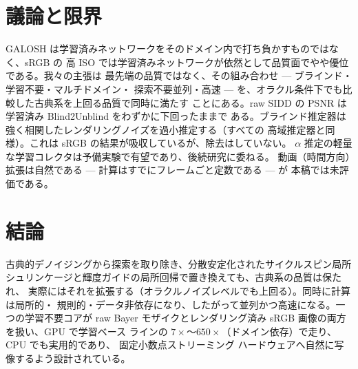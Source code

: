 \documentclass[10pt,twocolumn]{article}
\begin{document}
\section{議論と限界}
GALOSH は学習済みネットワークをそのドメイン内で打ち負かすものではなく、sRGB の
高 ISO では学習済みネットワークが依然として品質面でやや優位である。我々の主張は
最先端の品質ではなく、その組み合わせ --- ブラインド・学習不要・マルチドメイン・
探索不要並列・高速 --- を、オラクル条件下でも比較した古典系を上回る品質で同時に満たす
ことにある。raw SIDD の PSNR は学習済み Blind2Unblind をわずかに下回ったままで
ある。ブラインド推定器は強く相関したレンダリングノイズを過小推定する（すべての
高域推定器と同様）。これは sRGB の結果が吸収しているが、除去はしていない。
$\alpha$ 推定の軽量な学習コレクタは予備実験で有望であり、後続研究に委ねる。
動画（時間方向）拡張は自然である --- 計算はすでにフレームごと定数である --- が
本稿では未評価である。

\section{結論}
古典的デノイジングから探索を取り除き、分散安定化されたサイクルスピン局所
シュリンケージと輝度ガイドの局所回帰で置き換えても、古典系の品質は保たれ、
実際にはそれを拡張する（オラクルノイズレベルでも上回る）。同時に計算は局所的・
規則的・データ非依存になり、したがって並列かつ高速になる。一つの学習不要コアが
raw Bayer モザイクとレンダリング済み sRGB 画像の両方を扱い、GPU で学習ベース
ラインの $7\times$〜$650\times$（ドメイン依存）で走り、CPU でも実用的であり、
固定小数点ストリーミング
ハードウェアへ自然に写像するよう設計されている。
\end{document}
